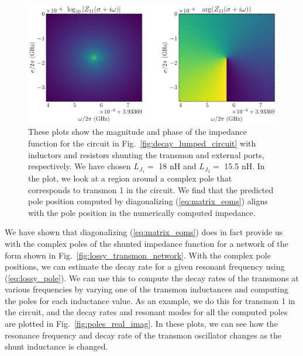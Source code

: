 \begin{figure}[!h]
    \centering
    \includegraphics[width=\textwidth]{figures/fully_shunted_impedance.pdf}
    \caption{These plots show the magnitude and phase of the impedance function for the circuit in Fig.\ \ref{fig:decay_lumped_circuit} with inductors and resistors shunting the transmon and external ports, respectively. We have chosen $L_{J_1}=$ 18 nH and $L_{J_2}=$ 15.5 nH. In the plot, we look at a region around a complex pole that corresponds to transmon 1 in the circuit. We find that the predicted pole position computed by diagonalizing (\ref{eq:matrix_eoms}) aligns with the pole position in the numerically computed impedance.}
    \label{fig:shunted_impedance_plot}
\end{figure}

We have shown that diagonalizing (\ref{eq:matrix_eoms}) does in fact provide us with the complex poles of the shunted impedance function for a network of the form shown in Fig.\ \ref{fig:lossy_transmon_network}. With the complex pole positions, we can estimate the decay rate for a given resonant frequency using (\ref{eq:lossy_pole}). We can use this to compute the decay rates of the transmons at various frequencies by varying one of the transmon inductances and computing the poles for each inductance value. As an example, we do this for transmon 1 in the circuit, and the decay rates and resonant modes for all the computed poles are plotted in Fig.\ \ref{fig:poles_real_imag}. In these plots, we can see how the resonance frequency and decay rate of the transmon oscillator changes as the shunt inductance is changed.


